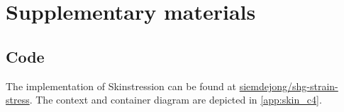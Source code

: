 \section{Supplementary materials}
\subsection{Code}
The implementation of Skinstression can be found at \href{https://github.io/siemdejong/shg-strain-stress}{ siemdejong/shg-strain-stress}.
The context and container diagram are depicted in \cref{app:skin_c4}.
